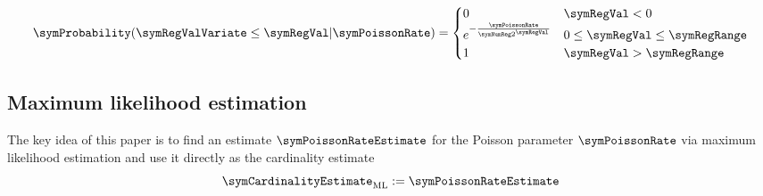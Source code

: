 \documentclass[11pt]{article} %
\begin{document}
\begin{equation}
\label{equ:register_value_distribution}
\symProbability(\symRegValVariate \leq \symRegVal\vert\symPoissonRate)
=
\begin{cases}
0 & \symRegVal < 0 \\
e^{-\frac{\symPoissonRate}{\symNumReg 2^\symRegVal}} & 0\leq \symRegVal \leq \symRegRange \\
1 & \symRegVal > \symRegRange
\end{cases}
\end{equation}

\subsection{Maximum likelihood estimation}
The key idea of this paper is to find an estimate $\symPoissonRateEstimate$ for the Poisson parameter $\symPoissonRate$ via maximum likelihood estimation and use it directly as the cardinality estimate 
\begin{equation}
\symCardinalityEstimate_\text{ML} := \symPoissonRateEstimate
\end{equation}
\end{document}
